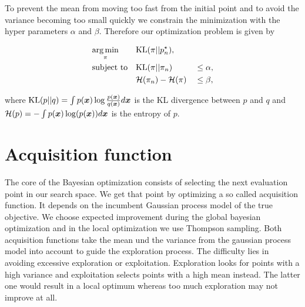 To prevent the mean from moving too fast from the initial point and to avoid the variance becoming too small quickly we constrain the minimization with the hyper parameters $\alpha$ and $\beta$. Therefore our optimization problem is given by

\begin{align}
    & \underset{\pi}{\arg\min} & & \mathrm{KL}(\pi||p_n^\star),& &\notag\\
    & \text{subject to}
    & & \mathrm{KL}(\pi||\pi_n) & &\leq \alpha,\label{eq:kl:our}\\
    & & &{\cal H}(\pi_n) - {\cal H}(\pi) & &\leq \beta,\label{eq:entropy:our}
\end{align}

where $\mathrm{KL}(p||q) = \int p({\boldsymbol{x}}) \log \frac{p({\boldsymbol{x}})}{q({\boldsymbol{x}})} d{\boldsymbol{x}}$ is the KL divergence between $p$ and $q$ and ${\cal H}(p) = -\int p({\boldsymbol{x}})\log(p({\boldsymbol{x}})) d{\boldsymbol{x}}$ is the entropy of $p$.


\section{Acquisition function}
The core of the Bayesian optimization consists of selecting the next evaluation point in our search space. We get that point by optimizing a so called acquisition function. It depends on the incumbent Gaussian process model of the true objective. We choose expected improvement during the global bayesian optimization and in the local optimization we use Thompson sampling. Both acquisition functions take the mean und the variance from the gaussian process model into account to guide the exploration process. The difficulty lies in avoiding excessive exploration or exploitation. Exploration looks for points with a high variance and exploitation selects points with a high mean instead. The latter one would result in a local optimum whereas too much exploration may not improve at all.

